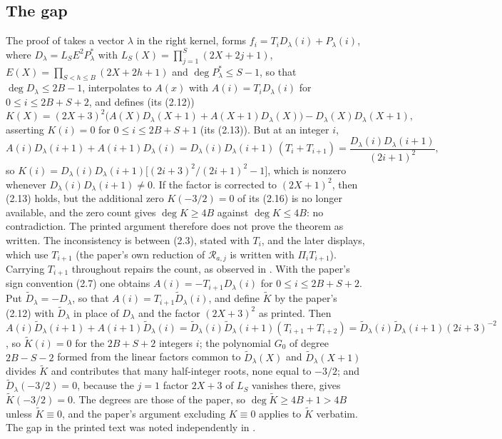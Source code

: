 \documentclass[11pt]{amsart}
\theoremstyle{definition}
\begin{document}
\subsection{The gap}
The proof of \cite[Theorem~2.1]{Sun26} takes a vector $\lambda$ in the right kernel, forms
$f_i=T_iD_\lambda(i)+P_\lambda(i)$, where $D_\lambda=L_SE^2P^*_\lambda$ with $L_S(X)=\prod_{j=1}^S(2X+2j+1)$,
$E(X)=\prod_{S<h\le B}(2X+2h+1)$ and $\deg P^*_\lambda\le S-1$, so that $\deg D_\lambda\le2B-1$, interpolates to
$A(x)$ with $A(i)=T_iD_\lambda(i)$ for $0\le i\le2B+S+2$, and defines (its (2.12))
\[
K(X)=(2X+3)^2\bigl(A(X)D_\lambda(X+1)+A(X+1)D_\lambda(X)\bigr)-D_\lambda(X)D_\lambda(X+1),
\]
asserting $K(i)=0$ for $0\le i\le2B+S+1$ (its (2.13)). But at an integer $i$,
\[
A(i)D_\lambda(i+1)+A(i+1)D_\lambda(i)=D_\lambda(i)D_\lambda(i+1)\,(T_i+T_{i+1})=\frac{D_\lambda(i)D_\lambda(i+1)}{(2i+1)^2},
\]
so $K(i)=D_\lambda(i)D_\lambda(i+1)\bigl[(2i+3)^2/(2i+1)^2-1\bigr]$, which is nonzero whenever
$D_\lambda(i)D_\lambda(i+1)\ne0$. If the factor is corrected to $(2X+1)^2$, then (2.13) holds, but the additional
zero $K(-3/2)=0$ of its (2.16) is no longer available, and the zero count gives $\deg K\ge4B$ against
$\deg K\le4B$: no contradiction. The printed argument therefore does not prove the theorem as written. The inconsistency is between (2.3), stated with $T_i$, and the later displays, which use $T_{i+1}$ (the paper's own reduction of $\mathcal R_{a,j}$ is written with $\Pi_iT_{i+1}$). Carrying $T_{i+1}$ throughout repairs the count, as observed in \cite{MO26}. With the paper's sign
convention (2.7) one obtains $A(i)=-T_{i+1}D_\lambda(i)$ for $0\le i\le2B+S+2$. Put $\widetilde D_\lambda=-D_\lambda$,
so that $A(i)=T_{i+1}\widetilde D_\lambda(i)$, and define $\widetilde K$ by the paper's (2.12) with $\widetilde D_\lambda$
in place of $D_\lambda$ and the factor $(2X+3)^2$ as printed. Then
$A(i)\widetilde D_\lambda(i+1)+A(i+1)\widetilde D_\lambda(i)=\widetilde D_\lambda(i)\widetilde D_\lambda(i+1)(T_{i+1}+T_{i+2})=\widetilde D_\lambda(i)\widetilde D_\lambda(i+1)(2i+3)^{-2}$,
so $\widetilde K(i)=0$ for the $2B+S+2$ integers $i$; the polynomial $G_0$ of degree $2B-S-2$ formed from the linear
factors common to $\widetilde D_\lambda(X)$ and $\widetilde D_\lambda(X+1)$ divides $\widetilde K$ and contributes that many
half-integer roots, none equal to $-3/2$; and $\widetilde D_\lambda(-3/2)=0$, because the $j=1$ factor $2X+3$ of $L_S$
vanishes there, gives $\widetilde K(-3/2)=0$. The degrees are those of the paper, so $\deg\widetilde K\ge4B+1>4B$ unless
$\widetilde K\equiv0$, and the paper's argument excluding $K\equiv0$ applies to $\widetilde K$ verbatim. The gap in the printed text was noted independently in \cite{HN26}.
\end{document}
